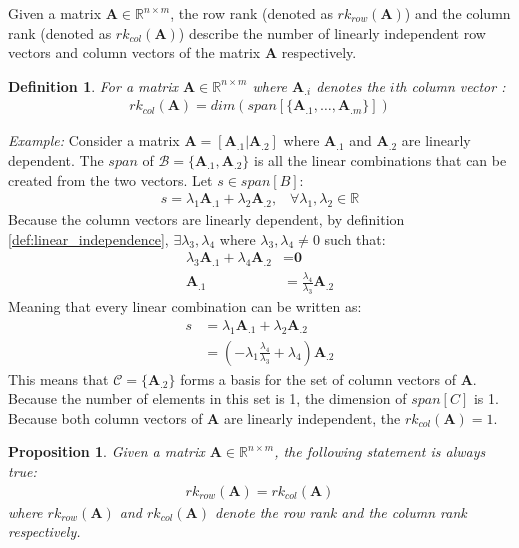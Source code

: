 \documentclass[a4paper,12pt]{article}
\newcommand{\set}[1]{\mathcal{#1}}
\newcommand{\matrx}[1]{\bm{#1}}
\newcommand{\vectr}[1]{\textbf{#1}}
\newcommand{\real}{\mathbb{R}}
\newcommand{\italic}[1]{\textit{#1}}
\newcommand{\rrank}[1]{rk_{row}(\matrx{#1})}
\newcommand{\crank}[1]{rk_{col}(\matrx{#1})}
\newtheorem{definition}{Definition}[section]
\newtheorem{proposition}{Proposition}[section]
\begin{document}
	Given a matrix $ \matrx{A} \in \real^{n \times m} $, the row rank (denoted as $ \rrank{A} $) and the column rank (denoted as $ \crank{A} $) describe the number of linearly independent row vectors and column vectors of the matrix $ \matrx{A} $ respectively.
	\begin{definition}
		\normalfont For a matrix $ \matrx{A} \in \real^{n \times m} $ where $ \matrx{A}_{.i} $ denotes the $ i $th column vector \cite{rank_dim_span}:
		\begin{align}
			\crank{A} = dim(span[\{\matrx{A}_{.1}, \ldots, \matrx{A}_{.m}\}])
		\end{align}
		\label{prop:c_rank_dim}
	\end{definition}
	\noindent\italic{Example:}
	Consider a matrix $\matrx{A} = [\matrx{A}_{.1} | \matrx{A}_{.2}]$ where $ \matrx{A}_{.1} $ and $ \matrx{A}_{.2} $ are linearly dependent. The $ span $ of $\set{B} = \{\matrx{A}_{.1}, \matrx{A}_{.2}\} $ is all the linear combinations that can be created from the two vectors. Let $ s \in span[B] $:  
	\begin{align}
		s = \lambda_1 \matrx{A}_{.1} + \lambda_2 \matrx{A}_{.2}, \hspace{10pt}\forall \lambda_1, \lambda_2 \in \real
	\end{align}
	Because the column vectors are linearly dependent, by definition \ref{def:linear_independence}, $ \exists \lambda_3, \lambda_4$ where $ \lambda_3,\lambda_4 \ne 0 $ such that: 
	\begin{align}
		\lambda_3 \matrx{A}_{.1} + \lambda_4 \matrx{A}_{.2} &= \vectr{0} \\
		\matrx{A}_{.1} &= \frac{\lambda_4}{\lambda_3} \matrx{A}_{.2}
	\end{align}
	Meaning that every linear combination can be written as:
	\begin{align}
		s &= \lambda_1 \matrx{A}_{.1} + \lambda_2 \matrx{A}_{.2} \\
		&= (-\lambda_1 \frac{\lambda_4}{\lambda_3} + \lambda_4) \matrx{A}_{.2}
	\end{align}
	This means that $ \set{C} = \{\matrx{A}_{.2}\} $ forms a basis for the set of column vectors of $ \matrx{A} $. Because the number of elements in this set is 1, the dimension of $ span[C] $ is 1. Because both column vectors of $ \matrx{A} $ are linearly independent, the $ \crank{A} = 1$.
	\begin{proposition}
		\normalfont Given a matrix $ \matrx{A} \in \real^{n \times m}$, the following statement is always true:
		\begin{align}
			\rrank{A} = \crank{A}
			\label{eq:row_rank_col_rank}
		\end{align}
		where $ \rrank{A} $ and $ \crank{A} $ denote the row rank and the column rank respectively.
		\label{prop:row_rank_col_rank}
	\end{proposition}
	
\end{document}
